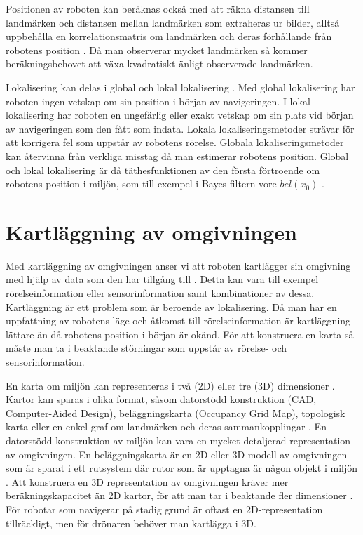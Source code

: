 Positionen av roboten kan beräknas också med att räkna distansen till landmärken och distansen mellan landmärken som extraheras ur bilder, alltså uppbehålla en korrelationsmatris om landmärken och deras förhållande från robotens position \citep{realslamproblem, ProbabilisticRobotics}. Då man observerar mycket landmärken så kommer beräkningsbehovet att växa kvadratiskt änligt observerade landmärken. 

Lokalisering kan delas i global och lokal lokalisering \citep{982903, globalsubmaps}. Med global lokalisering har roboten ingen vetskap om sin position i början av navigeringen. I lokal lokalisering har roboten en ungefärlig eller exakt vetskap om sin plats vid början av navigeringen som den fått som indata. Lokala lokaliseringsmetoder strävar för att korrigera fel som uppstår av robotens rörelse. Globala lokaliseringsmetoder kan återvinna från verkliga misstag då man estimerar robotens position. Global och lokal lokalisering är då täthesfunktionen av den första förtroende om robotens position i miljön, som till exempel i Bayes filtern vore $bel(x_0)$ \citep{ProbabilisticRobotics}.

\section{Kartläggning av omgivningen}

Med kartläggning av omgivningen anser vi att roboten kartlägger sin omgivning med hjälp av data som den har tillgång till \citep{ProbabilisticRobotics}. Detta kan vara till exempel rörelseinformation eller sensorinformation samt kombinationer av dessa. Kartläggning är ett problem som är beroende av lokalisering. Då man har en uppfattning av robotens läge och åtkomst till rörelseinformation är kartläggning lättare än då robotens position i början är okänd. För att konstruera en karta så måste man ta i beaktande störningar som uppstår av rörelse- och sensorinformation.

En karta om miljön kan representeras i två (2D) eller tre (3D) dimensioner \citep{geospatial}. Kartor kan sparas i olika format, såsom datorstödd konstruktion (CAD, Computer-Aided Design), beläggningskarta (Occupancy Grid Map), topologisk karta eller en enkel graf om landmärken och deras sammankopplingar \citep{982903}. En datorstödd konstruktion av miljön kan vara en mycket detaljerad representation av omgivningen. En beläggningskarta är en 2D eller 3D-modell av omgivningen som är sparat i ett rutsystem där rutor som är upptagna är någon objekt i miljön \citep{6095058, 982903}. Att konstruera en 3D representation av omgivningen kräver mer beräkningskapacitet än 2D kartor, för att man tar i beaktande fler dimensioner \citep{ProbabilisticRobotics}. För robotar som navigerar på stadig grund är oftast en 2D-representation tillräckligt, men för drönaren behöver man kartlägga i 3D.

